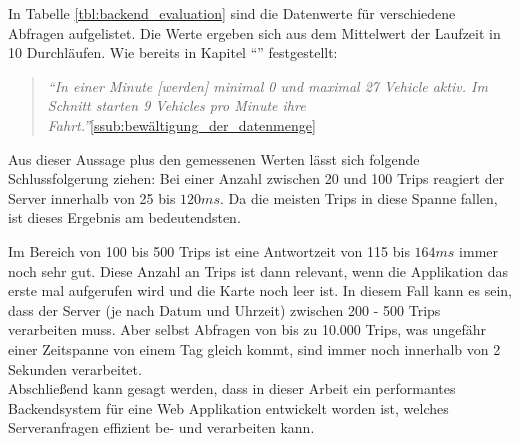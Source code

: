     In Tabelle \ref{tbl:backend_evaluation} sind die Datenwerte für verschiedene Abfragen aufgelistet. Die Werte ergeben sich aus dem Mittelwert der Laufzeit in 10 Durchläufen. Wie bereits in Kapitel "`"' festgestellt:

    \begin{quote}
      \textit{"`In einer Minute [werden] minimal 0 und maximal 27 Vehicle aktiv. Im Schnitt starten 9 Vehicles pro Minute ihre Fahrt."'}\ref{ssub:bewältigung_der_datenmenge}
    \end{quote}

    Aus dieser Aussage plus den gemessenen Werten lässt sich folgende Schlussfolgerung ziehen: Bei einer Anzahl zwischen 20 und 100 Trips reagiert der Server innerhalb von 25 bis $120ms$. Da die meisten Trips in diese Spanne fallen, ist dieses Ergebnis am bedeutendsten. 

    Im Bereich von 100 bis 500 Trips ist eine Antwortzeit von 115 bis $164ms$ immer noch sehr gut. Diese Anzahl an Trips ist dann relevant, wenn die Applikation das erste mal aufgerufen wird und die Karte noch leer ist. In diesem Fall kann es sein, dass der Server (je nach Datum und Uhrzeit) zwischen 200 - 500 Trips verarbeiten muss. Aber selbst Abfragen von bis zu 10.000 Trips, was ungefähr einer Zeitspanne von einem Tag gleich kommt, sind immer noch innerhalb von 2 Sekunden verarbeitet.\\

    Abschließend kann gesagt werden, dass in dieser Arbeit ein performantes Backendsystem für eine Web Applikation entwickelt worden ist, welches Serveranfragen effizient be- und verarbeiten kann.

    
